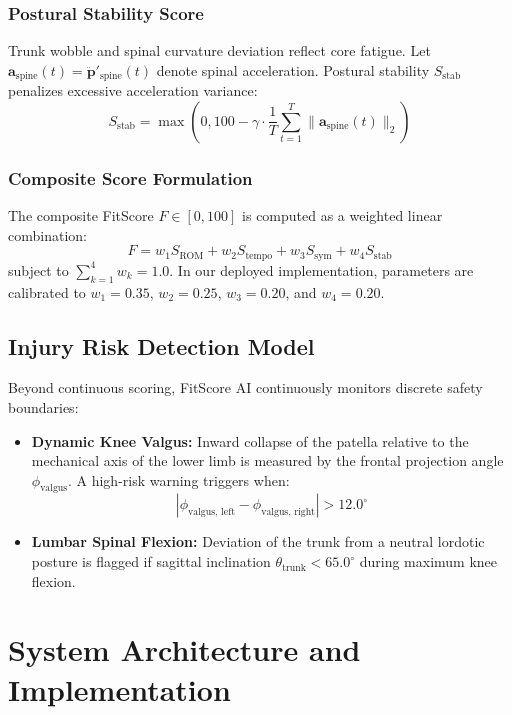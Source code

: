 \documentclass[conference]{IEEEtran}
\begin{document}
\subsubsection{Postural Stability Score}
Trunk wobble and spinal curvature deviation reflect core fatigue. Let $\mathbf{a}_{\text{spine}}(t) = \ddot{\mathbf{p}}'_{\text{spine}}(t)$ denote spinal acceleration. Postural stability $S_{\text{stab}}$ penalizes excessive acceleration variance:
\begin{equation}
    S_{\text{stab}} = \max\left(0, 100 - \gamma \cdot \frac{1}{T}\sum_{t=1}^T \|\mathbf{a}_{\text{spine}}(t)\|_2\right)
\end{equation}

\subsubsection{Composite Score Formulation}
The composite FitScore $F \in [0, 100]$ is computed as a weighted linear combination:
\begin{equation}
    F = w_1 S_{\text{ROM}} + w_2 S_{\text{tempo}} + w_3 S_{\text{sym}} + w_4 S_{\text{stab}}
\end{equation}
subject to $\sum_{k=1}^4 w_k = 1.0$. In our deployed implementation, parameters are calibrated to $w_1 = 0.35$, $w_2 = 0.25$, $w_3 = 0.20$, and $w_4 = 0.20$.

\subsection{Injury Risk Detection Model}
Beyond continuous scoring, FitScore AI continuously monitors discrete safety boundaries:
\begin{itemize}
    \item \textbf{Dynamic Knee Valgus:} Inward collapse of the patella relative to the mechanical axis of the lower limb is measured by the frontal projection angle $\phi_{\text{valgus}}$. A high-risk warning triggers when:
    \begin{equation}
        |\phi_{\text{valgus, left}} - \phi_{\text{valgus, right}}| > 12.0^\circ
    \end{equation}
    \item \textbf{Lumbar Spinal Flexion:} Deviation of the trunk from a neutral lordotic posture is flagged if sagittal inclination $\theta_{\text{trunk}} < 65.0^\circ$ during maximum knee flexion.
\end{itemize}

\section{System Architecture and Implementation}
\end{document}
